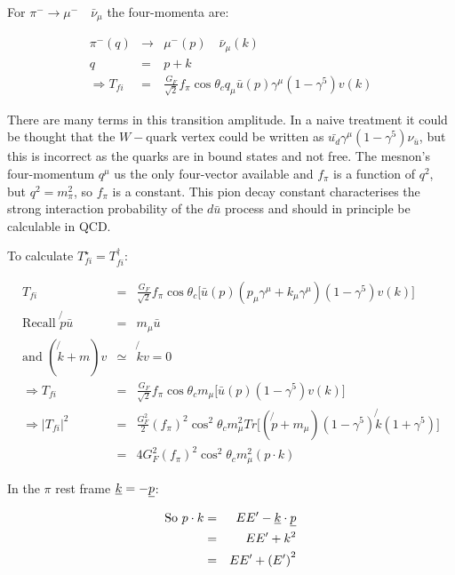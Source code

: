 For $\pi^- \to \mu^- \quad \bar{\nu}_{\mu}$ the four-momenta are:

\begin{eqnarray*}
  \pi^-(q) & \to & \mu^-(p) \quad \bar{\nu}_{\mu}(k) \\
  q & = & p + k \\
  \Rightarrow T_{fi} & = & \frac{G_F}{\sqrt{2}}f_{\pi}\cos\theta_c q_{\mu}\bar{u}(p)\gamma^{\mu}\left(1 - \gamma^5\right)v(k)
\end{eqnarray*}

There are many terms in this transition amplitude.  In a naive treatment it could be thought that the $W-$quark vertex could be written as $\bar{u_d}\gamma^{\mu}\left(1 - \gamma^5\right)\nu_{\bar{u}}$, but this is incorrect as the quarks are in bound states and not free.  The mesnon's four-momentum $q^{\mu}$ us the only four-vector available and $f_{\pi}$ is a function of $q^2$, but $q^2 = m^2_{\pi}$, so $f_{\pi}$ is a constant.  This pion decay constant characterises the strong interaction probability of the $d \bar{u}$ process and should in principle be calculable in QCD.

To calculate $T_{fi}^{\star} = T_{fi}^{\dagger}$:

\begin{eqnarray*}
  T_{fi} & = & \frac{G_F}{\sqrt{2}}f_{\pi}\cos\theta_c\Big[\bar{u}(p)\left(p_{\mu}\gamma^{\mu} + k_{\mu}\gamma^{\mu}\right)\left(1 - \gamma^5\right)v(k)\Big] \\
  \textrm{Recall } \not{p}\bar{u} & = & m_{\mu}\bar{u} \\
  \textrm{and }\left(\not{k} + m\right) v & \simeq & \not{k}v = 0 \\
  \Rightarrow T_{fi} & = & \frac{G_F}{\sqrt{2}}f_{\pi}\cos\theta_c m_{\mu}\Big[\bar{u}(p)\left(1 - \gamma^5\right)v(k)\Big] \\
  \Rightarrow |T_{fi}|^2 & = & \frac{G_F^2}{2}\left(f_{\pi}\right)^2\cos^2\theta_c m^2_{\mu}Tr\Big[\left(\not{p} + m_{\mu}\right)\left(1 - \gamma^5\right)\not{k}\left(1 + \gamma^5\right)\Big] \\
  & = & 4G_F^2\left(f_{\pi}\right)^2\cos^2\theta_c m^2_{\mu}\left(p \cdot k \right)
\end{eqnarray*}

In the $\pi$ rest frame $\underline{k} = -\underline{p}$:

\begin{eqnarray*}
  \textrm{So } p \cdot k & = & EE' - \underline{k}\cdot\underline{p} \\
  & = & EE' + k^2 \\
  & = & EE' + \left(E'\right)^2
\end{eqnarray*}


